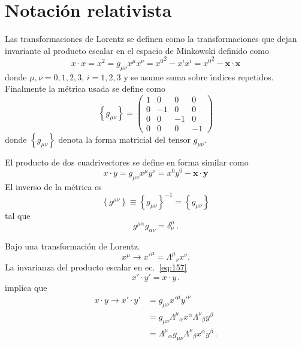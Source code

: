 \section{Notaci\'on relativista}
\label{sec:srn}
\begin{frame}
Las transformaciones de Lorentz se definen como la transformaciones que dejan invariante al producto escalar en el espacio de Minkowski definido como
\begin{equation}
  \label{eq:146}
 x\cdot x= x^2=g_{\mu\nu}x^\mu x^\nu={x^0}^2-x^i x^i={x^0}^2-\mathbf{x}\cdot\mathbf{x}
\end{equation}
donde $\mu,\nu=0,1,2,3$, $i=1,2,3$ y se asume suma sobre \'\i ndices repetidos.
Finalmente la métrica usada se define como
\begin{equation}
  \label{eq:gmunu}
  \left\{ g_{\mu\nu} \right\}=
  \begin{pmatrix}
    1&0&0&0\\
    0&-1&0&0\\
    0&0&-1&0\\
    0&0&0&-1
  \end{pmatrix}
\end{equation}
donde $\left\{ g_{\mu\nu} \right\}$ denota la forma matricial del tensor $g_{\mu\nu}$.  



El producto de dos cuadrivectores se define en forma similar como
\begin{equation}
\label{eq:157}
  x\cdot y=g_{\mu\nu}x^\mu y^\nu=x^0y^0-\mathbf{x}\cdot\mathbf{y}
\end{equation}
El inverso de la métrica es
\begin{equation}
  \left\{ g^{\mu\nu} \right\}\equiv\left\{ g_{\mu\nu} \right\}^{-1}=\left\{ g_{\mu\nu} \right\}
\end{equation}
tal que
\begin{equation}
  g^{\mu\alpha}g_{\alpha\nu}=\delta^\mu_\nu\,.
\end{equation}

Bajo una transformación de Lorentz.
\begin{equation}
  \label{eq:xx5}
  x^\mu\to {x'}^\mu={\Lambda^\mu}_{\nu}x^\nu.
\end{equation}
La invarianza del producto escalar en ec.~\eqref{eq:157}
\begin{equation}
  {x'}\cdot {y'}=x\cdot y\,.
\end{equation}
implica que
\begin{align}
\label{eq:Lambdasteps}
{x}\cdot{y}\to  {x'}\cdot{y'}&=g_{\mu\nu}{x'}^\mu{y'}^{\nu}\nonumber\\
  &=g_{\mu\nu}{\Lambda^{\mu}}_{\alpha}x^{\alpha}{\Lambda^{\nu}}_{\beta}y^{\beta}\nonumber\\
 &={\Lambda^{\mu}}_{\alpha}g_{\mu\nu}{\Lambda^{\nu}}_{\beta}x^{\alpha}y^{\beta}\,.
\end{align}


\end{frame}
